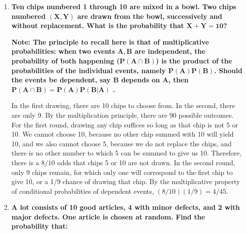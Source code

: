 \documentclass[10pt, oneside]{article}
\begin{document}
\begin{enumerate}[label=2.\arabic*]
\begin{enumerate}
	 The probability that less than 2 defective items are found (namely, exactly 1 and 0 defective items are found) is:
	 
	 \[ \frac{ \binom{400}{1} \binom{1100}{199} + \binom{400}{0} \binom{1100}{200}}{\binom{1500}{200}} \]
	 
	 Therefore, the probability that at least 2 defective items are found is:
	 
	  \[ \boxed{ 1 - \Bigg[ \frac{ \binom{400}{1} \binom{1100}{199} + \binom{400}{0} \binom{1100}{200}}{\binom{1500}{200}} \Bigg] } \]

	\end{enumerate}
\item \begin{tcolorbox}[
  colback=Cerulean!5!white,
  colframe=Cerulean!75!black]
  \textbf{Ten chips numbered 1 through 10 are mixed in a bowl. Two chips numbered $\bm{(X,Y)}$ are drawn from the bowl, successively and without replacement. What is the probability that $\bm{X + Y = 10}$?}
   \end{tcolorbox}
   
   \textbf{Note: The principle to recall here is that of multiplicative probabilities: when two events $\bm{A, B}$ are independent, the probability of both happening ($\bm{P(A \cap B)}$) is the product of the probabilities of the individual events, namely $\bm{P(A)P(B)}$. Should the events be dependent, say $\bm{B}$ depends on $\bm{A}$, then $\bm{P(A \cap B) = P(A) P(B | A)}$ .}
   
   In the first drawing, there are 10 chips to choose from. In the second, there are only 9. By the multiplication principle, there are 90 possible outcomes. For the first round, drawing any chip suffices so long as that chip is not 5 or 10. We cannot choose 10, because no other chip summed with 10 will yield 10, and we also cannot choose 5, because we do not replace the chips, and there is no other number to which 5 can be summed to give us 10. Therefore, there is a $8/10$ odds that chips 5 or 10 are not drawn. In the second round, only 9 chips remain, for which only one will correspond to the first chip to give 10, or a 1/9 chance of drawing that chip. By the multiplicative property of conditional probabilities of dependent events, $(8/10)(1/9) = \boxed{4/45}$.

\item \begin{tcolorbox}[
  colback=Cerulean!5!white,
  colframe=Cerulean!75!black]
  \textbf{A lot consists of 10 good articles, 4 with minor defects, and 2 with major defects. One article is chosen at random. Find the probability that:}
  \end{tcolorbox}
  

\end{enumerate}
\end{document}
